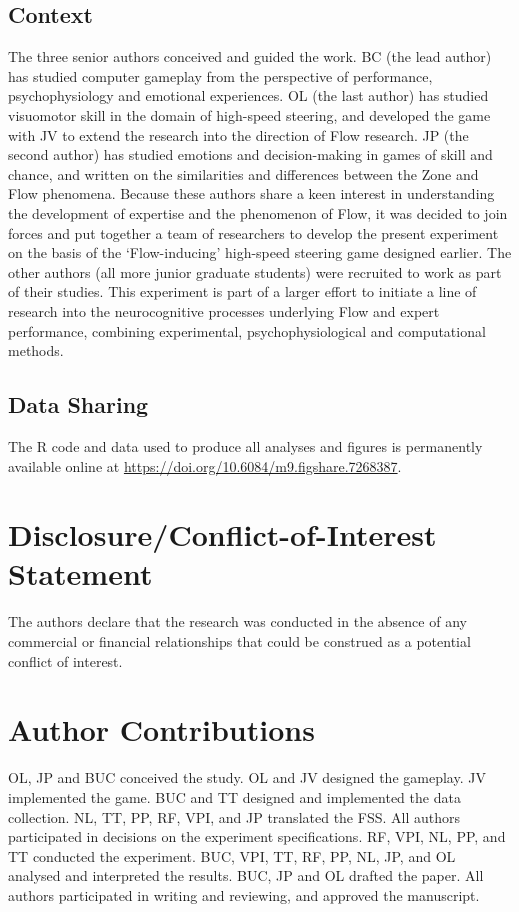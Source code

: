 \documentclass{frontierstyle/frontiersSCNS}
\begin{document}
\subsection{Context}
The three senior authors conceived and guided the work. BC (the lead author) has studied computer gameplay from the perspective of performance, psychophysiology and emotional experiences. OL (the last author) has studied visuomotor skill in the domain of high-speed steering, and developed the game with JV to extend the research into the direction of Flow research. JP (the second author) has studied emotions and decision-making in games of skill and chance, and written on the similarities and differences between the Zone and Flow phenomena. Because these authors share a keen interest in understanding the development of expertise and the phenomenon of Flow, it was decided to join forces and put together a team of researchers to develop the present experiment on the basis of the `Flow-inducing' high-speed steering game designed earlier. The other authors (all more junior graduate students) were recruited to work as part of their studies. This experiment is part of a larger effort to initiate a line of research into the neurocognitive processes underlying Flow and expert performance, combining experimental, psychophysiological and computational methods.


\subsection{Data Sharing}
The {\sf R} code and data used to produce all analyses and figures is permanently available online at \url{https://doi.org/10.6084/m9.figshare.7268387}.


\section*{Disclosure/Conflict-of-Interest Statement}
The authors declare that the research was conducted in the absence of any commercial or financial relationships that could be construed as a potential conflict of interest.


\section*{Author Contributions}
OL, JP and BUC conceived the study.
OL and JV designed the gameplay.
JV implemented the game.
BUC and TT designed and implemented the data collection.
NL, TT, PP, RF, VPI, and JP translated the FSS.
All authors participated in decisions on the experiment specifications.
RF, VPI, NL, PP, and TT conducted the experiment.
BUC, VPI, TT, RF, PP, NL, JP, and OL analysed and interpreted the results.
BUC, JP and OL drafted the paper.
All authors participated in writing and reviewing, and approved the manuscript.
\end{document}
